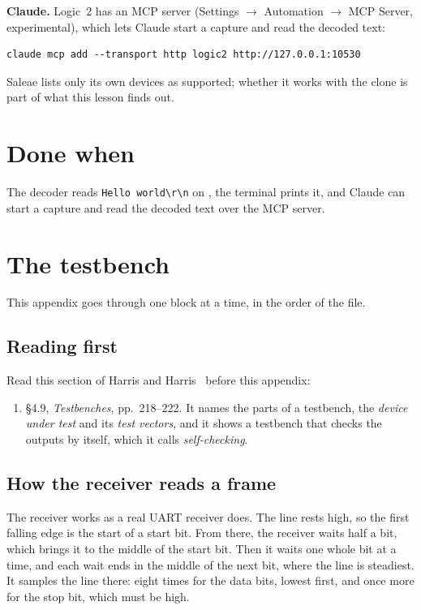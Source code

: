 \documentclass[11pt,a4paper]{article}
\begin{document}
\textbf{Claude.} Logic~2 has an MCP server (Settings $\to$ Automation $\to$ MCP Server, experimental), which lets Claude start a capture and read the decoded text:

\begin{verbatim}
claude mcp add --transport http logic2 http://127.0.0.1:10530
\end{verbatim}

Saleae lists only its own devices as supported; whether it works with the clone is part of what this lesson finds out.

\section*{Done when}

The decoder reads \texttt{Hello world\textbackslash r\textbackslash n} on , the terminal prints it, and Claude can start a capture and read the decoded text over the  MCP server.

\appendix
\section{The testbench}\label{app:testbench}

This appendix goes through  one block at a time, in the order of the file.

\subsection*{Reading first}

Read this section of Harris and Harris~\cite{ddca} before this appendix:
\begin{enumerate}
  \item §4.9, \emph{Testbenches}, pp.~218--222. It names the parts of a testbench, the \emph{device under test} and its \emph{test vectors}, and it shows a testbench that checks the outputs by itself, which it calls \emph{self-checking}.
\end{enumerate}

\subsection*{How the receiver reads a frame}

The receiver works as a real UART receiver does. The line rests high, so the first falling edge is the start of a start bit. From there, the receiver waits half a bit, which brings it to the middle of the start bit. Then it waits one whole bit at a time, and each wait ends in the middle of the next bit, where the line is steadiest. It samples the line there: eight times for the data bits, lowest first, and once more for the stop bit, which must be high.
\end{document}
